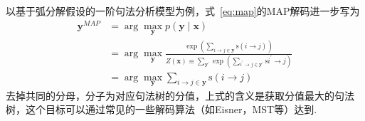 以基于弧分解假设的一阶句法分析模型为例，式~\ref{eq:map}的MAP解码进一步写为
\begin{equation}
	\label{eq:map-dep}
	\begin{split}
		\boldsymbol{y}^{MAP}&=\arg\max_{\boldsymbol{y}}p(\boldsymbol{y}\mid\boldsymbol{x})\\
		&=\arg\max_{\boldsymbol{y}}\frac{\exp{\left(\sum_{i\rightarrow j\in \boldsymbol{y}}\mathrm{s}(i\rightarrow j)\right)}}{Z(\boldsymbol{x})\equiv \sum_{\boldsymbol{y}^{\prime}}\exp{\left(\sum_{i^{\prime}\rightarrow j\in \boldsymbol{y}^{\prime}}\mathrm{s}i^{\prime}\rightarrow j\right)}}\\
		&=\arg\max_{\boldsymbol{y}}\sum_{i\rightarrow j\in \boldsymbol{y}}\mathrm{s}(i\rightarrow j)
	\end{split}
\end{equation}
去掉共同的分母，分子为对应句法树的分值，上式的含义是获取分值最大的句法树，这个目标可以通过常见的一些解码算法（如Eisner，MST等）达到.

